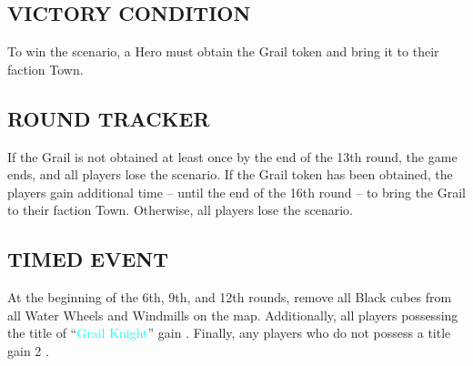 \begin{multicols*}{2}
\subsection*{\MakeUppercase{Victory Condition}}
To win the scenario, a Hero must obtain the Grail token and bring it to their faction Town.
\subsection*{\MakeUppercase{Round Tracker}}
If the Grail is not obtained at least once by the end of the 13th round, the game ends, and all players lose the scenario.
If the Grail token has been obtained, the players gain additional time – until the end of the 16th round – to bring the Grail to their faction Town. Otherwise, all players lose the scenario.
\subsection*{\MakeUppercase{Timed Event}}
At the beginning of the 6th, 9th, and 12th rounds, remove all Black cubes from all Water Wheels and Windmills on the map. Additionally, all players possessing the title of “\textcolor{cyan}{Grail Knight}” gain . Finally, any players who do not possess a title gain 2 .
\end{multicols*}





